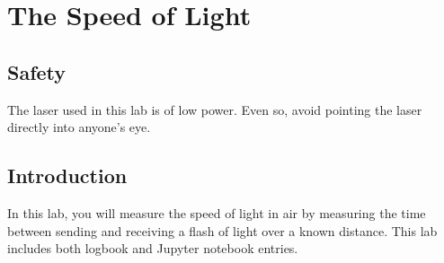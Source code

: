 \chapter{The Speed of Light}






\section{Safety}
The laser used in this lab is of low power.  Even so, avoid pointing the laser directly into anyone's eye.

\section{Introduction}

In this lab, you will measure the speed of light in air by measuring
the time between sending and receiving a flash of light over a known
distance.  This lab includes both logbook and Jupyter notebook
entries.

